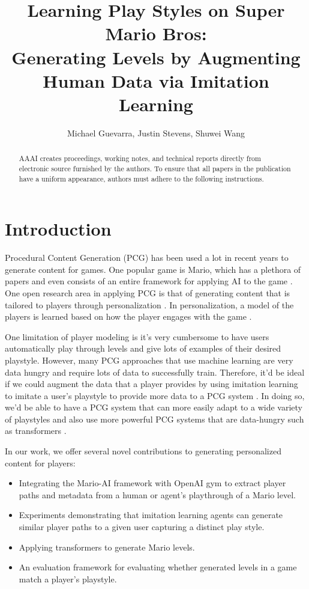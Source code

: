 \documentclass[letterpaper]{article} %
\title{Learning Play Styles on Super Mario Bros: \\ Generating Levels by Augmenting Human Data via Imitation Learning}
\author{
    Michael Guevarra\equalcontrib,
    Justin Stevens\equalcontrib,
    Shuwei Wang\equalcontrib
}
\begin{document}
\maketitle

\begin{abstract}
AAAI creates proceedings, working notes, and technical reports directly from electronic source furnished by the authors. To ensure that all papers in the publication have a uniform appearance, authors must adhere to the following instructions.
\end{abstract}

\section{Introduction}
Procedural Content Generation (PCG) has been used a lot in recent years to generate content for games. One popular game is Mario, which has a plethora of papers \cite{dahlskog2014multi, summerville2016super} and even consists of an entire framework for applying AI to the game \cite{karakovskiy2012mario}. One open research area in applying PCG is that of generating content that is tailored to players through personalization \cite{yannakakis2015experience} \cite{summerville2016learning}. In personalization, a model of the players is learned based on how the player engages with the game \cite{yannakakis2013player}. 

One limitation of player modeling is it's very cumbersome to have users automatically play through levels and give lots of examples of their desired playstyle. However, many PCG approaches that use machine learning are very data hungry and require lots of data to successfully train. Therefore, it'd be ideal if we could augment the data that a player provides by using imitation learning to imitate a user's playstyle to provide more data to a PCG system \cite{hussein2017imitation}. In doing so, we'd be able to have a PCG system that can more easily adapt to a wide variety of playstyles and also use more powerful PCG systems that are data-hungry such as transformers \cite{vaswani2017attention}.

In our work, we offer several novel contributions to generating personalized content for players:
\begin{itemize}
    \item Integrating the Mario-AI framework with OpenAI gym to extract player paths and metadata from a human or agent's playthrough of a Mario level. 
    \item Experiments demonstrating that imitation learning agents can generate similar player paths to a given user capturing a distinct play style. 
    \item Applying transformers to generate Mario levels. 
    \item An evaluation framework for evaluating whether generated levels in a game match a player's playstyle. 
\end{itemize}
\end{document}
